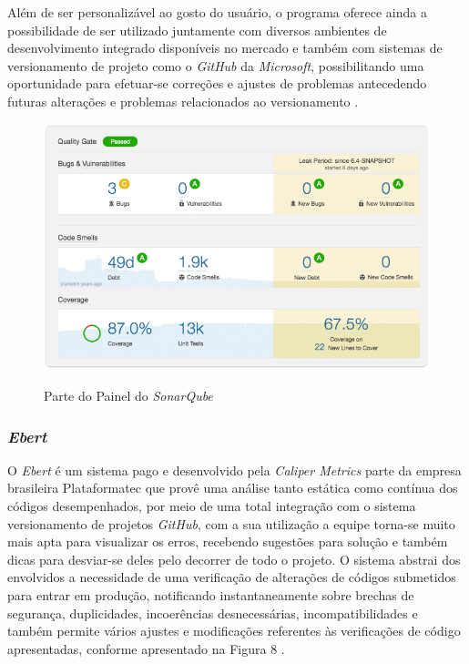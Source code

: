 Além de ser personalizável ao gosto do usuário, o programa oferece ainda a possibilidade de ser utilizado juntamente com diversos ambientes de desenvolvimento integrado disponíveis no mercado e também com sistemas de versionamento de projeto como o \textit{GitHub} da \textit{Microsoft}, possibilitando uma oportunidade para efetuar-se correções e ajustes de problemas antecedendo futuras alterações e problemas relacionados ao versionamento \cite{DevQA}. 

\FloatBarrier
\begin{figure}[!htbp]
	\centering
		\caption{Parte do Painel do \textit{SonarQube}} 
	\includegraphics[scale=0.6]{imagens/SONAR2}
	\label{fig:figura7}
\end{figure}
\FloatBarrier

\subsubsection{\textit{Ebert}}

 O \textit{Ebert} é um sistema pago e desenvolvido pela \textit{Caliper Metrics} parte da empresa brasileira Plataformatec que provê uma análise tanto estática como contínua dos códigos desempenhados, por meio de uma total integração com o sistema versionamento de projetos \textit{GitHub}, com a sua utilização a equipe torna-se muito mais apta para visualizar os erros, recebendo sugestões para solução e também dicas para desviar-se deles pelo decorrer de todo o projeto. O sistema abstrai dos envolvidos a necessidade de uma verificação de alterações de códigos submetidos para entrar em produção, notificando instantaneamente sobre brechas de segurança, duplicidades, incoerências desnecessárias, incompatibilidades e também permite vários ajustes e modificações referentes às verificações de código apresentadas, conforme apresentado na Figura 8 \cite{Ebert}.
 
